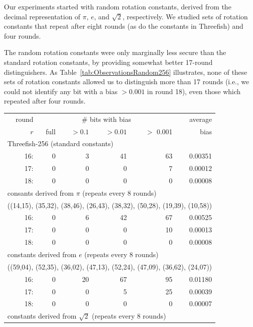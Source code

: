 \documentclass[11pt,twoside]{article}
\begin{document}
Our experiments started with random rotation constants, derived from the decimal representation of $\pi$, $e$, and $\sqrt{2}$, respectively. We studied sets of rotation constants that repeat after eight rounds (as do the constants in Threefish) and four rounds.

The random rotation constants were only marginally less secure than the standard rotation constants, by providing somewhat better 17-round distinguishers.  As Table~\ref{tab:ObservationsRandom256} illustrates, none of these sets of rotation constants allowed us to distinguish more than 17 rounds (i.e., we could not identify any bit with a bias $>0.001$ in round 18), even those which repeated after four rounds.

\begin{table}[htbp]
  \centering
\begin{tabular}{|r|rrrr|r|}
\hline
round & \multicolumn{ 4}{c|}{\# bits with bias} & average\\
$r$ & \quad full & $>0.1$ & $>0.01$ & $>$ 0.001 & bias \\  \hline \hline
\multicolumn{6}{|l|}{Threefish-256 (standard constants)} \\ 
 16: &  0 &  3 &  41 &  63 & 0.00351  \\
 17: &  0 &  0 &  0 &  7 & 0.00012  \\
 18: &  0 &  0 &  0 &  0 & 0.00008  \\ \hline\hline
\multicolumn{6}{|l|}{consants derived from $\pi$ (repeats every 8 rounds)} \\ 
\multicolumn{6}{|l|}{((14,15), (35,32), (38,46), (26,43),
                      (38,32), (50,28), (19,39), (10,58))} \\ 
 16: &  0 &  6 &  42 &  67 & 0.00525  \\
 17: &  0 &  0 &  0 &  10 & 0.00013  \\
 18: &  0 &  0 &  0 &  0 & 0.00008  \\ \hline\hline
\multicolumn{6}{|l|}{constants derived from $e$ (repeats every 8 rounds)} \\
\multicolumn{6}{|l|}{((59,04), (52,35), (36,02), (47,13),
                      (52,24), (47,09), (36,62), (24,07))} \\
 16: &  0 &  20 &  67 &  95 & 0.01180  \\
 17: &  0 &  0 &  5 &  25 & 0.00039  \\
 18: &  0 &  0 &  0 &  0 & 0.00007  \\ \hline\hline
\multicolumn{6}{|l|}{constants derived from $\sqrt{2}$ (repeats every 8 rounds)} \\ 

\end{tabular}
\end{table}
\end{document}
